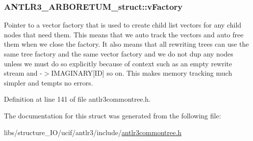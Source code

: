 \hypertarget{struct_a_n_t_l_r3___a_r_b_o_r_e_t_u_m__struct_a0f3ce5ddf38502f608a82ff48c63617c}{
\subsubsection[{v\-Factory}]{ A\-N\-T\-L\-R3\-\_\-\-A\-R\-B\-O\-R\-E\-T\-U\-M\-\_\-struct\-::v\-Factory}}\label{struct_a_n_t_l_r3___a_r_b_o_r_e_t_u_m__struct_a0f3ce5ddf38502f608a82ff48c63617c}
Pointer to a vector factory that is used to create child list vectors for any child nodes that need them. This means that we auto track the vectors and auto free them when we close the factory. It also means that all rewriting trees can use the same tree factory and the same vector factory and we do not dup any nodes unless we must do so explicitly because of context such as an empty rewrite stream and -\/$>$I\-M\-A\-G\-I\-N\-A\-R\-Y\mbox{[}I\-D\mbox{]} so on. This makes memory tracking much simpler and tempts no errors. 

Definition at line 141 of file antlr3commontree.\-h.



The documentation for this struct was generated from the following file\-:\begin{DoxyCompactItemize}
\item 
libs/structure\-\_\-\-I\-O/ucif/antlr3/include/\hyperlink{antlr3commontree_8h}{antlr3commontree.\-h}\end{DoxyCompactItemize}
